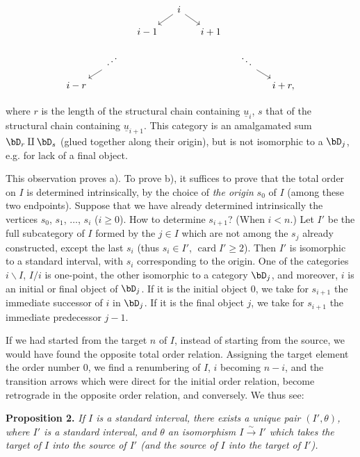 
\[
\begin{tikzcd}[column sep=small, row sep=small]
 & & & i \arrow[dl] \arrow[dr] & & & \\
 & & i-1 & & i+1 & & \\
 & \iddots \arrow[dl] & & & & \ddots \arrow[dr] & \\
 i-r & & & & & & i+r, %
\end{tikzcd}
\]

where $r$ is the length of the structural chain containing $\underline{u}_i$, $s$ that of the structural chain containing $\underline{u}_{i+1}$. This category is an amalgamated sum $\bD_r \amalg \bD_s$ (glued together along their origin), but is not isomorphic to a $\bD_j$, e.g. for lack of a final object.

This observation proves a). To prove b), it suffices to prove that the total order on $I$ is determined intrinsically, by the choice of \textit{the origin} $s_0$ of $I$ (among these %
two endpoints). Suppose that we have already determined intrinsically the vertices $s_0$, $s_1$, $\ldots$, $s_i$ ($i \geq 0$). How to determine $s_{i+1}$? (When $i < n$.) Let $I'$ be the full subcategory of $I$
formed by the $j \in I$ which are not among the $s_j$ already constructed, except the last $s_i$ (thus $s_i \in I'$, $\operatorname{card} I' \geq 2$). Then $I'$ is isomorphic to a standard interval, with $s_i$ corresponding to the origin. One of the categories $i\backslash I$, $I/i$ is one-point, the other isomorphic to a category $\bD_j$, and moreover, $i$ is an initial or final object of $\bD_j$. If it is the initial object $0$, we take for $s_{i+1}$ the immediate successor of $i$ in $\bD_j$. If it is the final object $j$, we take for $s_{i+1}$ the immediate predecessor $j-1$.

If we had started from the target $n$ of $I$, instead of starting from the source, we would have found the opposite total order relation. Assigning the target element the order number $0$, we find a renumbering of $I$, $i$ becoming $n-i$, and the transition arrows which were direct for the initial order relation, become retrograde in the opposite order relation, and conversely. We thus see:

\textbf{Proposition 2.} \textit{If $I$ is a standard interval, there exists a unique pair $(I',\theta)$, where $I'$ is a standard interval, and $\theta$ an isomorphism $I \xrightarrow{\sim} I'$ which takes the target of $I$ into the source of $I'$ (and the source of $I$ into the target of $I'$).}

